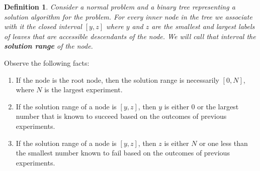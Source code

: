 \documentclass[12pt]{amsart}
\newtheorem{definition}[theorem]{Definition}
\theoremstyle{definition}
\theoremstyle{theorem}
\begin{document}
\begin{definition}\label{solution.range}
Consider a normal problem and a binary tree representing  a solution algorithm
for the problem. 
For every inner node in the tree we associate with it 
the closed interval $[y,z]$ where $y$ and $z$ are the smallest and 
largest labels of leaves that are accessible  descendants of the node.
We will call that interval the \textbf{solution range} of the node. 
\end{definition}

Observe the following facts:
\begin{enumerate}
\item
If the node is the root node, then the solution range is necessarily $[0,N]$, where $N$ is the 
largest experiment. 
\item
If the solution range of a node is $[y,z]$, then $y$ is either $0$ or 
the largest number that is known to succeed
based on the outcomes of previous experiments.
\item
If  the solution range of a node is $[y,z]$, then  $z$ is either $N$ or one less 
than the smallest number known to fail
based on the outcomes of previous experiments.
\end{enumerate}
\end{document}
